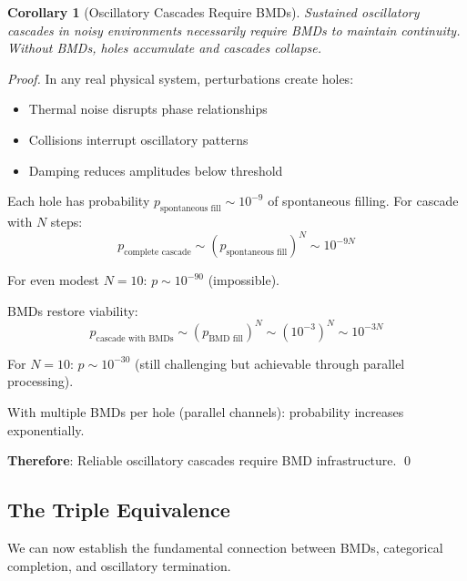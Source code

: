 \documentclass[11pt]{article}
\newtheorem{corollary}[theorem]{Corollary}
\theoremstyle{remark}
\begin{document}
\begin{corollary}[Oscillatory Cascades Require BMDs]
\label{cor:cascades_require_bmds}
Sustained oscillatory cascades in noisy environments necessarily require BMDs to maintain continuity. Without BMDs, holes accumulate and cascades collapse.
\end{corollary}

\begin{proof}
In any real physical system, perturbations create holes:
\begin{itemize}
\item Thermal noise disrupts phase relationships
\item Collisions interrupt oscillatory patterns
\item Damping reduces amplitudes below threshold
\end{itemize}

Each hole has probability $p_{\text{spontaneous fill}} \sim 10^{-9}$ of spontaneous filling. For cascade with $N$ steps:
\begin{equation}
p_{\text{complete cascade}} \sim (p_{\text{spontaneous fill}})^N \sim 10^{-9N}
\end{equation}

For even modest $N = 10$: $p \sim 10^{-90}$ (impossible).

BMDs restore viability:
\begin{equation}
p_{\text{cascade with BMDs}} \sim (p_{\text{BMD fill}})^N \sim (10^{-3})^N \sim 10^{-3N}
\end{equation}

For $N = 10$: $p \sim 10^{-30}$ (still challenging but achievable through parallel processing).

With multiple BMDs per hole (parallel channels): probability increases exponentially.

\textbf{Therefore}: Reliable oscillatory cascades require BMD infrastructure. \qed
\end{proof}

\subsection{The Triple Equivalence}

We can now establish the fundamental connection between BMDs, categorical completion, and oscillatory termination.
\end{document}
